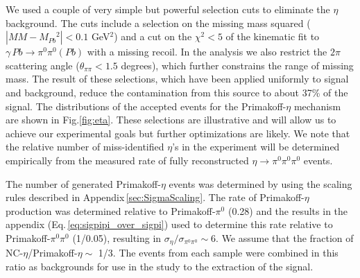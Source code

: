 We used a couple of very simple but powerful selection cuts to eliminate the $\eta$ background. The cuts include a selection on the missing mass squared ($|MM - M_{Pb}{^2}| < 0.1$ GeV$^2$) and a cut on the $\chi^2 < 5$ of the kinematic fit to $\gamma\,Pb\rightarrow \pi^0\pi^0 (Pb)$ with a missing recoil. In the analysis we also restrict the $2\pi$ scattering angle  ($\theta_{\pi\pi} <1.5$ degrees), which further constrains the range of missing mass. The result of these selections, which have been applied uniformly to signal and background, reduce the contamination from this source to about 37\% of the signal. The distributions of the accepted events for the Primakoff-$\eta$ mechanism are shown in Fig.\ref{fig:eta}. 
These selections are illustrative and will allow us to achieve our experimental goals but further optimizations are likely. We note that the relative number of miss-identified $\eta$'s in the experiment will be determined empirically from the measured rate of fully reconstructed $\eta\rightarrow\pi^0\pi^0\pi^0$ events.

The number of generated Primakoff-$\eta$ events was determined by using the scaling rules  described in Appendix\,\ref{sec:SigmaScaling}. The rate of Primakoff-$\eta$ production was determined relative to Primakoff-$\pi^0$ (0.28) and the results in the appendix (Eq.\,\ref{eq:sigpipi_over_sigpi}) used to determine this rate relative to Primakoff-$\pi^0\pi^0$ (1/0.05), resulting in $\sigma_\eta/\sigma_{\pi^0\pi^0} \sim 6$. We assume that the fraction of NC-$\eta$/Primakoff-$\eta \sim$ 1/3. The events from each sample were combined in this ratio as backgrounds for use in the study to the extraction of the signal.

